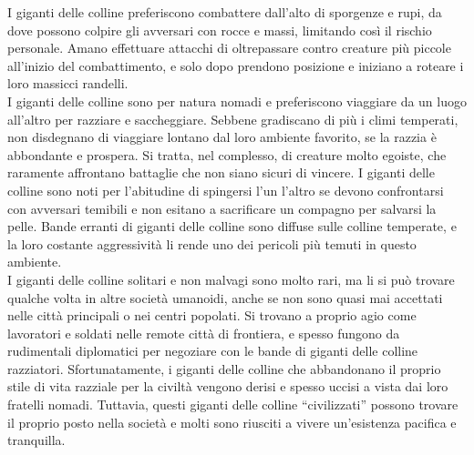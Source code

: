 \begin{multicols}{2}
I giganti delle colline preferiscono combattere dall'alto di sporgenze e rupi, da dove possono colpire gli avversari con rocce e massi, limitando così il rischio personale. Amano effettuare attacchi di oltrepassare contro creature più piccole all'inizio del combattimento, e solo dopo prendono posizione e iniziano a roteare i loro massicci randelli.\\
I giganti delle colline sono per natura nomadi e preferiscono viaggiare da un luogo all'altro per razziare e saccheggiare. Sebbene gradiscano di più i climi temperati, non disdegnano di viaggiare lontano dal loro ambiente favorito, se la razzia è abbondante e prospera. Si tratta, nel complesso, di creature molto egoiste, che raramente affrontano battaglie che non siano sicuri di vincere. I giganti delle colline sono noti per l'abitudine di spingersi l'un l'altro se devono confrontarsi con avversari temibili e non esitano a sacrificare un compagno per salvarsi la pelle. Bande erranti di giganti delle colline sono diffuse sulle colline temperate, e la loro costante aggressività li rende uno dei pericoli più temuti in questo ambiente.\\

I giganti delle colline solitari e non malvagi sono molto rari, ma li si può trovare qualche volta in altre società umanoidi, anche se non sono quasi mai accettati nelle città principali o nei centri popolati. Si trovano a proprio agio come lavoratori e soldati nelle remote città di frontiera, e spesso fungono da rudimentali diplomatici per negoziare con le bande di giganti delle colline razziatori. Sfortunatamente, i giganti delle colline che abbandonano il proprio stile di vita razziale per la civiltà vengono derisi e spesso uccisi a vista dai loro fratelli nomadi. Tuttavia, questi giganti delle colline “civilizzati” possono trovare il proprio posto nella società e molti sono riusciti a vivere un’esistenza pacifica e tranquilla.\\


\end{multicols}
